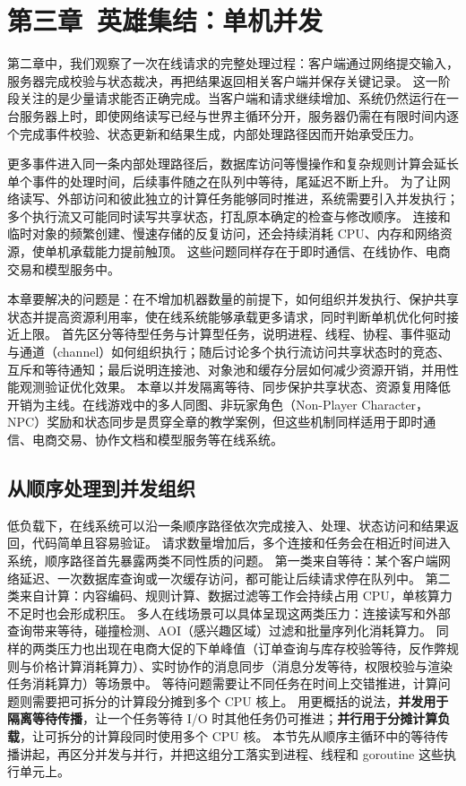 \section{第三章\ 英雄集结：单机并发}\label{sec:chapter3}

第二章中，我们观察了一次在线请求的完整处理过程：客户端通过网络提交输入，服务器完成校验与状态裁决，再把结果返回相关客户端并保存关键记录。
这一阶段关注的是少量请求能否正确完成。当客户端和请求继续增加、系统仍然运行在一台服务器上时，即使网络读写已经与世界主循环分开，服务器仍需在有限时间内逐个完成事件校验、状态更新和结果生成，内部处理路径因而开始承受压力。

更多事件进入同一条内部处理路径后，数据库访问等慢操作和复杂规则计算会延长单个事件的处理时间，后续事件随之在队列中等待，尾延迟不断上升。
为了让网络读写、外部访问和彼此独立的计算任务能够同时推进，系统需要引入并发执行；多个执行流又可能同时读写共享状态，打乱原本确定的检查与修改顺序。
连接和临时对象的频繁创建、慢速存储的反复访问，还会持续消耗 CPU、内存和网络资源，使单机承载能力提前触顶。
这些问题同样存在于即时通信、在线协作、电商交易和模型服务中。

本章要解决的问题是：在不增加机器数量的前提下，如何组织并发执行、保护共享状态并提高资源利用率，使在线系统能够承载更多请求，同时判断单机优化何时接近上限。
首先区分等待型任务与计算型任务，说明进程、线程、协程、事件驱动与通道（channel）如何组织执行；随后讨论多个执行流访问共享状态时的竞态、互斥和等待通知；最后说明连接池、对象池和缓存分层如何减少资源开销，并用性能观测验证优化效果。
本章以并发隔离等待、同步保护共享状态、资源复用降低开销为主线。在线游戏中的多人同图、非玩家角色（Non-Player Character，NPC）奖励和状态同步是贯穿全章的教学案例，但这些机制同样适用于即时通信、电商交易、协作文档和模型服务等在线系统。

\subsection{从顺序处理到并发组织}\label{sec3:concurrency-coordinate}

低负载下，在线系统可以沿一条顺序路径依次完成接入、处理、状态访问和结果返回，代码简单且容易验证。
请求数量增加后，多个连接和任务会在相近时间进入系统，顺序路径首先暴露两类不同性质的问题。
第一类来自等待：某个客户端网络延迟、一次数据库查询或一次缓存访问，都可能让后续请求停在队列中。
第二类来自计算：内容编码、规则计算、数据过滤等工作会持续占用 CPU，单核算力不足时也会形成积压。
多人在线场景可以具体呈现这两类压力：连接读写和外部查询带来等待，碰撞检测、AOI（感兴趣区域）过滤和批量序列化消耗算力。
同样的两类压力也出现在电商大促的下单峰值（订单查询与库存校验等待，反作弊规则与价格计算消耗算力）、实时协作的消息同步（消息分发等待，权限校验与渲染任务消耗算力）等场景中。
等待问题需要让不同任务在时间上交错推进，计算问题则需要把可拆分的计算段分摊到多个 CPU 核上。
用更概括的说法，\textbf{并发用于隔离等待传播}，让一个任务等待 I/O 时其他任务仍可推进；\textbf{并行用于分摊计算负载}，让可拆分的计算段同时使用多个 CPU 核。
本节先从顺序主循环中的等待传播讲起，再区分并发与并行，并把这组分工落实到进程、线程和 goroutine 这些执行单元上。

